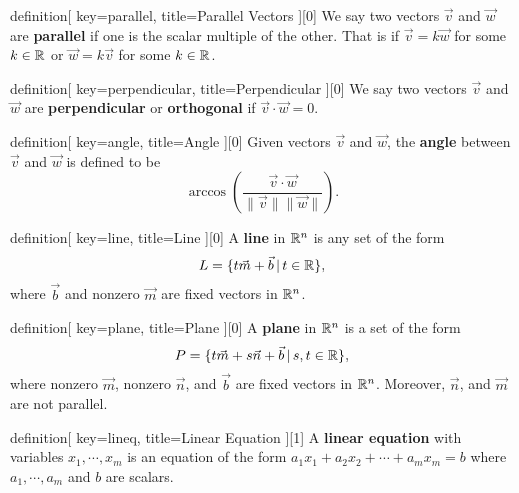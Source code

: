 \begin{SaveConcept}{definition}[
		key=parallel,
		title={Parallel Vectors}
	][0]
        We say two vectors $\vec v $ and $\vec w$ are\textbf{ parallel} if one is the scalar multiple of the other. That is if $\vec v=k \vec w$ for some $k\in \mathbb{R}$ or $\vec w=k\vec v$ for some $k\in \mathbb{R}$.
\end{SaveConcept}


\begin{SaveConcept}{definition}[
		key=perpendicular,
		title={Perpendicular}
	][0]
        We say two vectors $\vec v $ and $\vec w$ are \textbf{perpendicular} or\textbf{ orthogonal }if $\vec v\cdot\vec w=0$. 
\end{SaveConcept}


\begin{SaveConcept}{definition}[
		key=angle,
		title={Angle}
	][0]
        Given vectors $\vec v$ and $\vec w$, the \textbf{angle} between $\vec v$ and $\vec w$ is defined to be
  	$$
        \arccos\left(\frac{\vec v\cdot\vec w}{\|\vec v\|\|\vec w\|}\right).
  	$$
\end{SaveConcept}


\begin{SaveConcept}{definition}[
		key=line,
		title={Line}
	][0]
        A {\bf line} in  $\mathbb{R}^n$ is any set of the form
        $$
        L = \{ t \vec m + \vec b \,|\, t \in \mathbb{R}\},
        $$
        where $\vec b$ and nonzero $\vec m$  are fixed vectors in   $\mathbb{R}^n$.
\end{SaveConcept}





\begin{SaveConcept}{definition}[
		key=plane,
		title={Plane}
	][0]
        A {\bf plane} in  $\mathbb{R}^n$ is a set of the form
        $$
        P = \{ t \vec m + s \vec n + \vec b \,|\, s, t \in \mathbb{R}\},
        $$
        where nonzero $\vec m$, nonzero $\vec n$, and $\vec b$ are fixed vectors in   $\mathbb{R}^n$. Moreover, $\vec n$, and $\vec m$ are not parallel. 
\end{SaveConcept}





\begin{SaveConcept}{definition}[
		key=lineq,
		title={Linear Equation}
	][1]
        A \textbf{linear equation} with variables $x_1,\cdots, x_m$ is an equation of the form $a_{1}x_{1}+a_{2}x_{2}+\cdots+ a_{m}x_{m}=b$ where $a_1,\cdots, a_m$ and $b$ are scalars. 
\end{SaveConcept}


